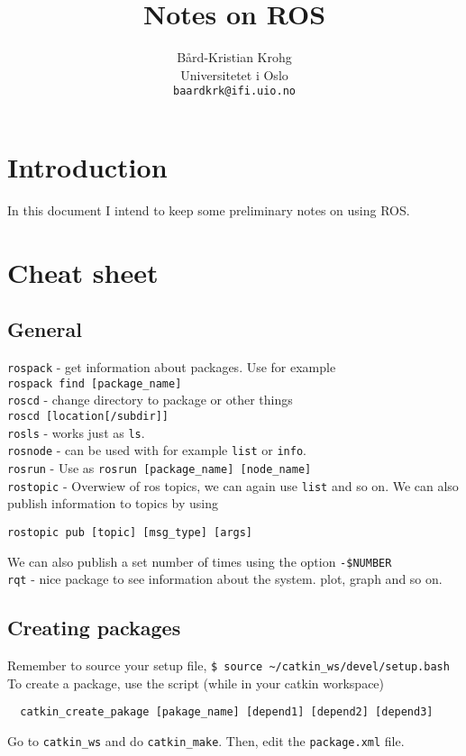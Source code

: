 \documentclass[12pt, a4paper, english]{article}
\title{Notes on ROS}
\author{Bård-Kristian Krohg \\ Universitetet i Oslo \\
\texttt{baardkrk@ifi.uio.no}}%
\begin{document}
\maketitle{}

%

\section{Introduction}
In this document I intend to keep some preliminary notes on using ROS.

\section{Cheat sheet}

\subsection{General}
\texttt{rospack} - get information about packages. Use for example \\
\texttt{rospack find [package\_name]} \\
\texttt{roscd} - change directory to package or other things \\
\texttt{roscd [location[/subdir]]} \\
\texttt{rosls} - works just as \texttt{ls}. \\
\texttt{rosnode} - can be used with for example \texttt{list} or \texttt{info}. \\
\texttt{rosrun} - Use as \texttt{rosrun [package\_name] [node\_name]} \\
\texttt{rostopic} - Overwiew of ros topics, we can again use \texttt{list} and so on. We can also publish information to topics by using
\begin{lstlisting}
rostopic pub [topic] [msg_type] [args]
\end{lstlisting}
We can also publish a set number of times using the option \texttt{-\$NUMBER} \\
\texttt{rqt} - nice package to see information about the system. plot, graph and so on.
\subsection{Creating packages}
Remember to source your setup file, \texttt{\$ source \textasciitilde/catkin\_ws/devel/setup.bash}
To create a package, use the script (while in your catkin workspace)
\begin{lstlisting}
  catkin_create_pakage [pakage_name] [depend1] [depend2] [depend3]
\end{lstlisting}
Go to \texttt{catkin\_ws} and do \texttt{catkin\_make}. Then, edit the \texttt{package.xml} file.
\end{document}
